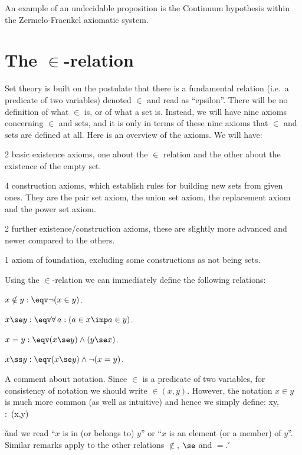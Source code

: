 An example of an undecidable proposition is the Continuum hypothesis within the Zermelo-Fraenkel axiomatic system.

\section[\texorpdfstring{The $\in$-relation}{The epsilon-relation}]{The $\in$-relation}

Set theory is built on the postulate that there is a fundamental relation (i.e.\ a predicate of two
variables) denoted $\in$\index{$\in$} and read as ``epsilon''. There will be no definition of what $\in$ is, or of
what a set is. Instead, we will have nine axioms concerning $\in$ and sets, and it is only in terms of these nine
axioms that $\in$ and sets are defined at all. Here is an overview of the axioms. We will have:
\bit
\item 2 basic existence axioms, one about the $\in$ relation and the other about the existence of the empty set.
\item 4 construction axioms, which establish rules for building new sets from given ones. They are the pair set axiom,
the union set axiom, the replacement axiom and the power set axiom.
\item 2 further existence/construction axioms, these are slightly more advanced and newer compared to the others.
\item 1 axiom of foundation, excluding some constructions as not being sets.
\eit

Using the $\in$-relation we can immediately define the following relations:
\bit
\item $x\notin y :\eqv \neg(x\in y)$.
\item $x\se y :\eqv \forall \, a : (a\in x \imp a\in y)$.
\item $x = y :\eqv (x\se y) \land (y\se x)$.
\item $x \ss y :\eqv (x \se y) \land \neg (x = y)$.
\eit

A comment about notation. Since $\in$ is a predicate of two variables, for consistency of notation we should write
$\in\!\!(x,y)$. However, the notation $x\in y$ is much more common (as well as intuitive) and hence we simply define:
\bse
x\in y, :\eqv\ \in\!\!(x,y)
\ese

\v

and we read ``$x$ is in (or belongs to) $y$'' or ``$x$ is an element (or a member) of $y$''. Similar remarks apply to
the other relations $\notin$, $\se$ and $=$. \v

